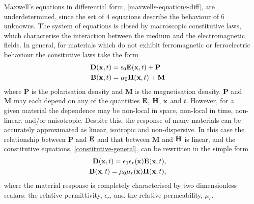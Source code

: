 Maxwell's equations in differential form, \eqref{maxwells-equations-diff}, are underdetermined, since the set of 4 equations describe the behaviour of 6 unknowns. The system of equations is closed by macroscopic constitutive laws, which characterise the interaction between the medium and the electromagnetic fields. In general, for materials which do not exhibit ferromagnetic or ferroelectric behaviour the consitutive laws take the form
\begin{subequations}
    \label{constitutive-general}
    \begin{align}
        \mathbf{D}(\mathbf{x},t) &= \epsilon_0 \mathbf{E}(\mathbf{x},t) + \mathbf{P} \label{constitutive-general-E} \\
        \mathbf{B}(\mathbf{x},t) &= \mu_0 \mathbf{H}(\mathbf{x},t) + \mathbf{M}
    \end{align}
\end{subequations}
where $\mathbf{P}$ is the polarisation density and $\mathbf{M}$ is the magnetisation density. $\mathbf{P}$ and $\mathbf{M}$ may each depend on any of the quantities $\mathbf{E}$, $\mathbf{H}$, $\mathbf{x}$ and $t$. However, for a given material the dependence may be non-local in space, non-local in time, non-linear, and/or anisotropic. Despite this, the response of many materials can be accurately approximated as linear, isotropic and non-dispersive. In this case the relationship between $\mathbf{P}$ and $\mathbf{E}$ and that between $\mathbf{M}$ and $\mathbf{H}$ is linear, and the constitutive equations, \eqref{constitutive-general}, can be rewritten in the simple form
%
\begin{subequations}
    \label{constitutive-linear}
    \begin{align}
        \mathbf{D}(\mathbf{x},t) = \epsilon_0 \epsilon_r(\mathbf{x}) \mathbf{E}(\mathbf{x},t), \label{constitutive-linear-D} \\
        \mathbf{B}(\mathbf{x},t) = \mu_0 \mu_r(\mathbf{x}) \mathbf{H}(\mathbf{x},t),
    \end{align}
\end{subequations}
%
where the material response is completely characterised by two dimensionless scalars: the relative permittivity, $\epsilon_r$, and the relative permeability, $\mu_r$.

